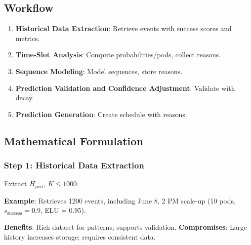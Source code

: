 \documentclass[12pt]{article}
\begin{document}
\subsection{Workflow}
\begin{enumerate}
    \item \textbf{Historical Data Extraction}: Retrieve events with success scores and metrics.
    \item \textbf{Time-Slot Analysis}: Compute probabilities/pods, collect reasons.
    \item \textbf{Sequence Modeling}: Model sequences, store reasons.
    \item \textbf{Prediction Validation and Confidence Adjustment}: Validate with decay.
    \item \textbf{Prediction Generation}: Create schedule with reasons.
\end{enumerate}

\subsection{Mathematical Formulation}
\subsubsection{Step 1: Historical Data Extraction}
Extract $H_{\text{perf}}$, $K \leq 1000$.

\textbf{Example}: Retrieves 1200 events, including June 8, 2 PM scale-up (10 pods, \( s_{\text{success}} = 0.9 \), ELU = 0.95).

\textbf{Benefits}: Rich dataset for patterns; supports validation.
\textbf{Compromises}: Large history increases storage; requires consistent data.
\end{document}
